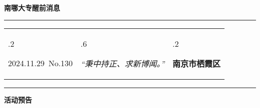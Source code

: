 \documentclass[letterpaper, 12pt]{article}
\begin{document}
\begin{center}
    \Huge\textbf{南哪大专醒前消息}
\end{center}
\vspace{4mm}
\hrule
\renewcommand\tabularxcolumn[1]{m{#1}}
\begin{tabularx}{\textwidth}{>{\hsize.2\hsize}X>{\hsize.6\hsize}X>{\hsize.2\hsize}X}
    \begin{flushleft}
        2024.11.29\, No.130
    \end{flushleft}
    &
    \begin{center}
        \textit{“秉中持正、求新博闻。”}
    \end{center}
    &
    \begin{flushright}
        \textbf{南京市栖霞区}
    \end{flushright}
\end{tabularx}
\vspace{-3.5mm}
\hrule
\vspace{4mm}
\centerline{\huge\textbf{活动预告}}
\end{document}
